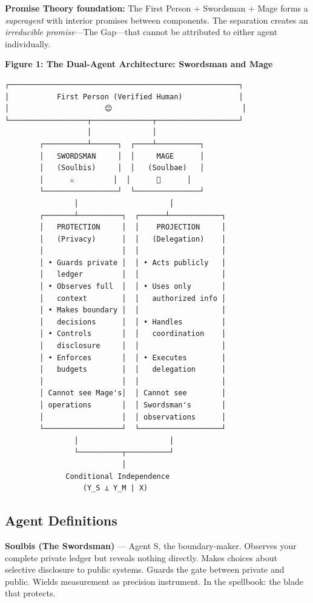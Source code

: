 \documentclass[
]{article}
\begin{document}
\textbf{Promise Theory foundation:} The First Person + Swordsman + Mage
forms a \emph{superagent} with interior promises between components. The
separation creates an \emph{irreducible promise}---The Gap---that cannot
be attributed to either agent individually.

\textbf{Figure 1: The Dual-Agent Architecture: Swordsman and Mage}

\begin{verbatim}
┌─────────────────────────────────────────────────────┐
│           First Person (Verified Human)             │
│                      😊                              │
└──────────────────┬──────────────┬───────────────────┘
                   │              │
        ┌──────────┴──────┐  ┌────┴──────────┐
        │   SWORDSMAN     │  │     MAGE      │
        │   (Soulbis)     │  │   (Soulbae)   │
        │      ⚔️         │  │      🧙      │
        └─────────────────┘  └───────────────┘
                │                     │
        ┌───────┴──────────┐  ┌──────┴────────────┐
        │   PROTECTION     │  │    PROJECTION     │
        │   (Privacy)      │  │   (Delegation)    │
        │                  │  │                   │
        │ • Guards private │  │ • Acts publicly   │
        │   ledger         │  │                   │
        │ • Observes full  │  │ • Uses only       │
        │   context        │  │   authorized info │
        │ • Makes boundary │  │                   │
        │   decisions      │  │ • Handles         │
        │ • Controls       │  │   coordination    │
        │   disclosure     │  │                   │
        │ • Enforces       │  │ • Executes        │
        │   budgets        │  │   delegation      │
        │                  │  │                   │
        │ Cannot see Mage's│  │ Cannot see        │
        │ operations       │  │ Swordsman's       │
        │                  │  │ observations      │
        └──────────────────┘  └───────────────────┘
                │                     │
                └──────────┬──────────┘
                           │
              Conditional Independence
                  (Y_S ⊥ Y_M | X)
\end{verbatim}

\subsection{Agent Definitions}\label{agent-definitions}

\textbf{Soulbis (The Swordsman)} --- Agent S, the boundary-maker.
Observes your complete private ledger but reveals nothing directly.
Makes choices about selective disclosure to public systems. Guards the
gate between private and public. Wields measurement as precision
instrument. In the spellbook: the blade that protects.
\end{document}
